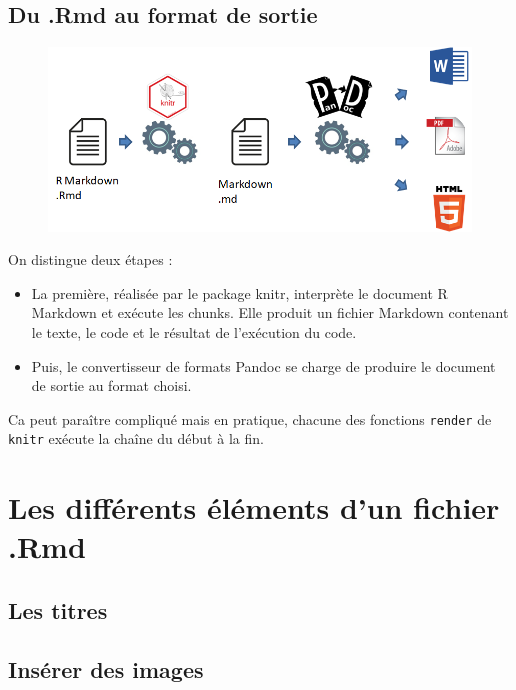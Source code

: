 \documentclass[]{article}
\providecommand{\tightlist}{%
  \setlength{\itemsep}{0pt}\setlength{\parskip}{0pt}}
\begin{document}
\subsection{Du .Rmd au format de
sortie}\label{du-.rmd-au-format-de-sortie}

\begin{figure}
\centering
\includegraphics{images/render.png}
\caption{}
\end{figure}

On distingue deux étapes :

\begin{itemize}
\tightlist
\item
  La première, réalisée par le package knitr, interprète le document R
  Markdown et exécute les chunks. Elle produit un fichier Markdown
  contenant le texte, le code et le résultat de l'exécution du code.
\item
  Puis, le convertisseur de formats Pandoc se charge de produire le
  document de sortie au format choisi.
\end{itemize}

Ca peut paraître compliqué mais en pratique, chacune des fonctions
\texttt{render} de \texttt{knitr} exécute la chaîne du début à la fin.

\section{Les différents éléments d'un fichier
.Rmd}\label{les-differents-elements-dun-fichier-.rmd}

\subsection{Les titres}\label{les-titres}

\subsection{Insérer des images}\label{inserer-des-images}
\end{document}
